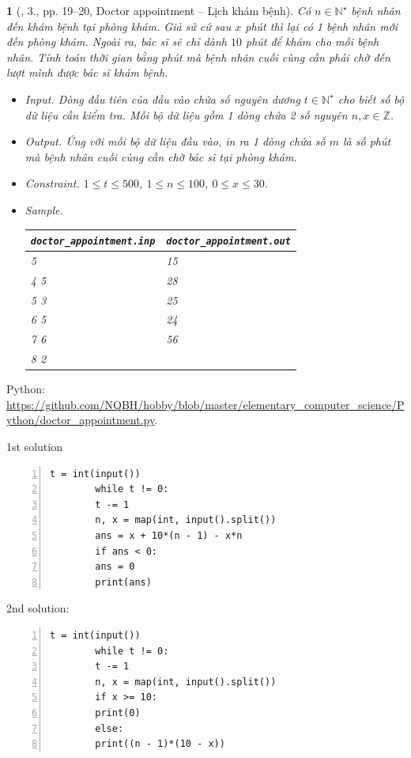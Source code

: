 \documentclass{article}
\newtheorem{baitoan}{}
\begin{document}
\begin{baitoan}[\cite{Duc_200_BT_Python}, 3., pp. 19--20, Doctor appointment -- Lịch khám bệnh]
	Có $n\in\mathbb{N}^\star$ bệnh nhân đến khám bệnh tại phòng khám. Giả sử cứ sau $x$ phút thì lại có 1 bệnh nhân mới đến phòng khám. Ngoài ra, bác sĩ sẽ chỉ dành $10$ phút để khám cho mỗi bệnh nhân. Tính toán thời gian bằng phút mà bệnh nhân cuối cùng cần phải chờ đến lượt mình được bác sĩ khám bệnh.
	\begin{itemize}
		\item {\sf Input.} Dòng đầu tiên của đầu vào chứa số nguyên dương $t\in\mathbb{N}^\star$ cho biết số bộ dữ liệu cần kiểm tra. Mỗi bộ dữ liệu gồm 1 dòng chứa 2 số nguyên $n,x\in\mathbb{Z}$.
		\item {\sf Output.} Ứng với mỗi bộ dữ liệu đầu vào, in ra 1 dòng chứa số $m$ là số phút mà bệnh nhân cuối cùng cần chờ bác sĩ tại phòng khám.
		\item {\sf Constraint.} $1\le t\le500$, $1\le n\le100$, $0\le x\le30$.
		\item {\sf Sample.}
		\begin{table}[H]
			\centering
			\begin{tabular}{|l|l|}
				\hline
				\verb|doctor_appointment.inp| & \verb|doctor_appointment.out| \\
				\hline
				5 & 15 \\
				4 5 & 28 \\
				5 3 & 25 \\
				6 5 & 24 \\
				7 6 & 56 \\
				8 2 & \\
				\hline
			\end{tabular}
		\end{table}
	\end{itemize}
\end{baitoan}
\noindent Python: \url{https://github.com/NQBH/hobby/blob/master/elementary_computer_science/Python/doctor_appointment.py}.
\begin{multicols}{2}
	1st solution \cite[3., p. 203]{Duc_200_BT_Python}
	\begin{Verbatim}[numbers=left,xleftmargin=5mm]
		t = int(input())
		while t != 0:
		t -= 1
		n, x = map(int, input().split())
		ans = x + 10*(n - 1) - x*n
		if ans < 0:
		ans = 0
		print(ans)
	\end{Verbatim}
	\columnbreak
	2nd solution:
	\begin{Verbatim}[numbers=left,xleftmargin=5mm]
		t = int(input())
		while t != 0:
		t -= 1
		n, x = map(int, input().split())
		if x >= 10:
		print(0)
		else:
		print((n - 1)*(10 - x))
	\end{Verbatim}
\end{multicols}
\end{document}
